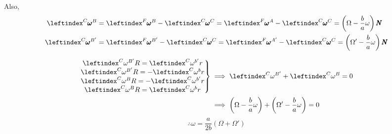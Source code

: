Also,
\begin{align*}
    \lx{^C}{\pmb \omega}^B &= \lx{^F}{\pmb \omega}^B - \lx{^C}{\pmb \omega}^C
    = \lx{^F}{\pmb \omega}^A - \lx{^C}{\pmb \omega}^C = \left( \Omega - \frac{b}{a} \omega \right) \pmb N\\
     \lx{^C}{\pmb \omega}^{B'} &= \lx{^F}{\pmb \omega}^{B'} - \lx{^C}{\pmb \omega}^C
    = \lx{^F}{\pmb \omega}^{A'} - \lx{^C}{\pmb \omega}^C = \left( \Omega' - \frac{b}{a} \omega \right) \pmb N
\end{align*}

\begin{align*}
    \left . \begin{matrix}
    \lx{^C}{\omega}^{B'} R =  \lx{^C}{\omega}^{b'} r\\
    \lx{^C}{\omega}^{B'} R =  -\lx{^C}{\omega}^{b} r\\
    \lx{^C}{\omega}^{B} R =  -\lx{^C}{\omega}^{b'} r\\
    \lx{^C}{\omega}^{B} R =  \lx{^C}{\omega}^{b} r\\
    \end{matrix} \right \} &\implies \lx{^C}{\omega}^{B'} + \lx{^C}{\omega}^{B} = 0\\
    &\implies \left( \Omega - \frac{b}{a} \omega \right) + \left( \Omega' - \frac{b}{a} \omega \right) =0 \\
\end{align*}
$$ \therefore \omega = \frac{a}{2b} \left( \Omega + \Omega' \right)$$
